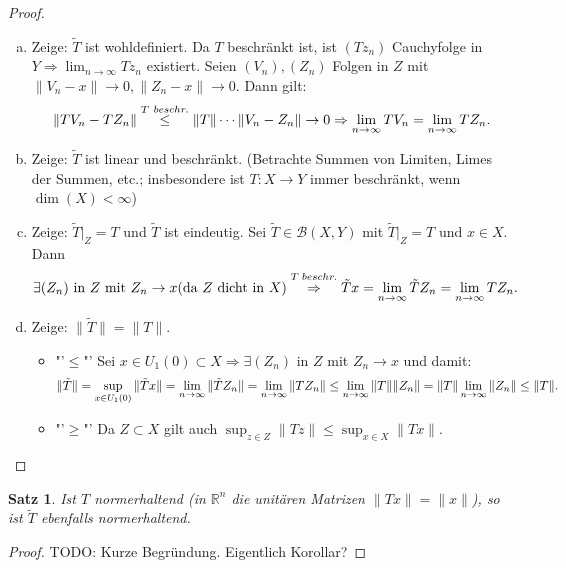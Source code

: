 \documentclass[ngerman]{report}
\theoremstyle{plain}%
\newtheorem{thm}{Satz}[chapter]
\theoremstyle{definition}%
\theoremstyle{myStyle}
\newcommand{\R}{\mathbb{R}}
\newcommand{\B}{\mathcal{B}} %
\newcommand{\norm}[1]{\|#1\|}
\newcommand{\df}[1][]{%
	\overset{#1}{\Rightarrow}
}
\newcommand{\limes}[1][\infty]{\lim_{n \to #1}}
\newcommand{\disp}{\displaystyle}
\newcommand{\spcm}[1][-0.8]{\vspace{#1 em}}
\begin{document}
	\begin{proof}
		\begin{enumerate}[a)]
			\item Zeige: $\tilde{T}$ ist wohldefiniert. Da $T$ beschränkt ist, ist $(Tz_n)$ Cauchyfolge in $Y \df \disp \limes  Tz_n$ existiert.
			Seien $(V_n), (Z_n)$ Folgen in $Z$ mit $\norm{V_n-x} \to 0, \norm{Z_n-x} \to 0.$ Dann gilt:
			 \vspace{-0.8em}$$ \norm{TV_n - TZ_n} \overset{T~beschr.}{\leq} \norm{T}\cdots \norm{V_n - Z_n} \to 0 \df \limes TV_n = \limes TZ_n.\vspace{-0.8em}$$
			\item Zeige: $\tilde{T}$ ist linear und beschränkt. (Betrachte Summen von Limiten, Limes der Summen, etc.; insbesondere ist $T:X \to Y$ immer beschränkt, wenn $\dim(X)<\infty$)
			\item Zeige: $\tilde{T}|_Z = T$ und $\tilde{T}$ ist eindeutig.
			Sei $\tilde{T} \in \B(X,Y)$ mit $\tilde{T}|_Z = T$ und $x \in X$. Dann 
				\spcm $$\exists (Z_n) \text{ in } Z \text{ mit } Z_n \to x (\text{da } Z \text{ dicht in } X) \overset{T\;beschr.}{\df} \tilde{T}x=\limes \tilde{T}Z_n = \limes TZ_n.\spcm$$
			\item Zeige: $\norm{\tilde{T}}=\norm{T}$.
			\begin{itemize}[]
				\item "'\;$\leq$\;"' Sei $x \in U_1(0)\subset X \df \exists (Z_n)$ in $Z$ mit $Z_n \to x$ und damit:
				\spcm[-0.75em] \[\norm{\tilde{T}} = \sup_{x \in U_1(0)}\norm{\tilde{T}x} = \limes \norm{\tilde{T}Z_n} = \limes \norm{TZ_n} \leq \limes \norm{T} \norm{Z_n} = \norm{T}\limes \norm{Z_n} \leq \norm{T}.\spcm \] 
				\item "'\;$\geq$\;"' Da $Z\subset X$ gilt auch $\disp \sup_{z \in Z} \norm{Tz} \leq \sup_{x \in X} \norm{Tx}$.
			\end{itemize}
		\end{enumerate}
	\end{proof}

	\begin{thm}
					Ist $T$ normerhaltend (in $\R^n$ die unitären Matrizen $\norm{Tx} = \norm{x}$), so ist $\tilde{T}$ ebenfalls normerhaltend.
	\end{thm}
		\begin{proof}
						TODO: Kurze Begründung. Eigentlich Korollar?%
		\end{proof}
\end{document}
